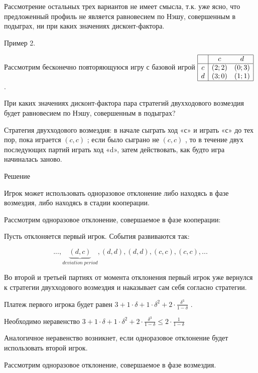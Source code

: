 \documentclass[pdftex,12pt,a4paper]{article}
\begin{document}
Рассмотрение остальных трех вариантов не имеет смысла, т.к. уже ясно, что предложенный профиль не является равновесием по Нэшу, совершенным в подыграх, ни при каких значениях дисконт-фактора.



Пример 2.

Рассмотрим бесконечно повторяющуюся игру с базовой игрой  $\begin{array}{|c|cc|}  \hline {} & {c} & {d} \\  \hline {c} & {\left(2;2\right)} & {\left(0;3\right)} \\ {d} & {\left(3;0\right)} & {\left(1;1\right)} \\  \hline  \end{array}$ .

При каких значениях дисконт-фактора пара стратегий двухходового возмездия будет равновесием по Нэшу, совершенным в подыграх?

Стратегия двухходового возмездия: в начале сыграть ход «с» и играть «с» до тех пор, пока играется  $\left(c,c\right)$ ; если было сыграно не  $\left(c,c\right)$ , то в течение двух последующих партий играть ход «d», затем действовать, как будто игра начиналась заново.

Решение

Игрок может использовать одноразовое отклонение либо находясь в фазе возмездия, либо находясь в стадии кооперации.

Рассмотрим одноразовое отклонение, совершаемое в фазе кооперации:

Пусть отклоняется первый игрок. События развиваются так:

$$...,\underbrace{\left(d,c\right)}_{deviation\; period},\left(d,d\right),\left(d,d\right),\left(c,c\right),\left(c,c\right),...$$

Во второй и третьей партиях от момента отклонения первый игрок уже вернулся к стратегии двухходового возмездия и наказывает сам себя согласно стратегии.

Платеж первого игрока будет равен  $3+1\cdot \delta +1\cdot \delta ^{2} +2\cdot \frac{\delta ^{3} }{1-\delta } $ .

Необходимо неравенство  $3+1\cdot \delta +1\cdot \delta ^{2} +2\cdot \frac{\delta ^{3} }{1-\delta } \le 2\cdot \frac{1}{1-\delta } $

Аналогичное неравенство возникнет, если одноразовое отклонение будет использовать второй игрок.

Рассмотрим одноразовое отклонение, совершаемое в фазе возмездия.
\end{document}

